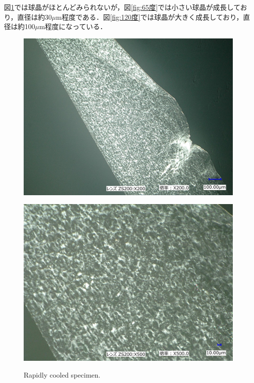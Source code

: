 図\ref{fig:rapid}では球晶がほとんどみられないが，図\ref{fig:65度}では小さい球晶が成長しており，直径は約30$\mu$m程度である．図\ref{fig:120度}では球晶が大きく成長しており，直径は約100$\mu$m程度になっている．
\begin{figure}[htbp]
    \begin{minipage}[htbp]{0.45\linewidth}
      \centering
      \includegraphics[keepaspectratio, scale=0.1]{Data/観察結果/rapid_cooling_200.jpg}
      \label{fig:rapid200}
    \end{minipage}
    \begin{minipage}[htbp]{0.45\linewidth}
      \centering
      \includegraphics[keepaspectratio, scale=0.1]{Data/観察結果/rapid_cooling_500.jpg}
      \label{fig:rapid500}
    \end{minipage}
    \centering
    \caption{Rapidly cooled specimen.}
    \label{fig:rapid}
\end{figure}


